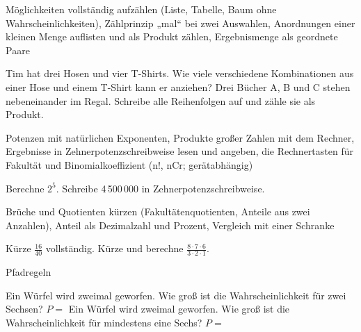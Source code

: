 \setcounter{aufgabe}{0}

\begin{aufgabe}{Möglichkeiten vollständig aufzählen (Liste, Tabelle, Baum ohne Wahrscheinlichkeiten), Zählprinzip „mal“ bei zwei Auswahlen, Anordnungen einer kleinen Menge auflisten und als Produkt zählen, Ergebnismenge als geordnete Paare}
\begin{teile}
\teil Tim hat drei Hosen und vier T-Shirts. Wie viele verschiedene Kombinationen aus einer Hose und einem T-Shirt kann er anziehen? \leerfeld
\teil Drei Bücher A, B und C stehen nebeneinander im Regal. Schreibe alle Reihenfolgen auf und zähle sie als Produkt. \leerfeld
\end{teile}
\end{aufgabe}

\begin{aufgabe}{Potenzen mit natürlichen Exponenten, Produkte großer Zahlen mit dem Rechner, Ergebnisse in Zehnerpotenzschreibweise lesen und angeben, die Rechnertasten für Fakultät und Binomialkoeffizient (n!, nCr; gerätabhängig)}
\begin{teile}
\teil Berechne $2^5$.
\teil Schreibe 4\,500\,000 in Zehnerpotenzschreibweise.
\end{teile}
\end{aufgabe}

\begin{aufgabe}{Brüche und Quotienten kürzen (Fakultätenquotienten, Anteile aus zwei Anzahlen), Anteil als Dezimalzahl und Prozent, Vergleich mit einer Schranke}
\begin{teile}
\teil Kürze $\frac{16}{40}$ vollständig.
\teil Kürze und berechne $\frac{8 \cdot 7 \cdot 6}{3 \cdot 2 \cdot 1}$.
\end{teile}
\end{aufgabe}

\begin{aufgabe}{Pfadregeln}
\begin{teile}
\teil Ein Würfel wird zweimal geworfen. Wie groß ist die Wahrscheinlichkeit für zwei Sechsen? $P = $ \leerfeld
\teil Ein Würfel wird zweimal geworfen. Wie groß ist die Wahrscheinlichkeit für mindestens eine Sechs? $P = $ \leerfeld
\end{teile}
\end{aufgabe}

